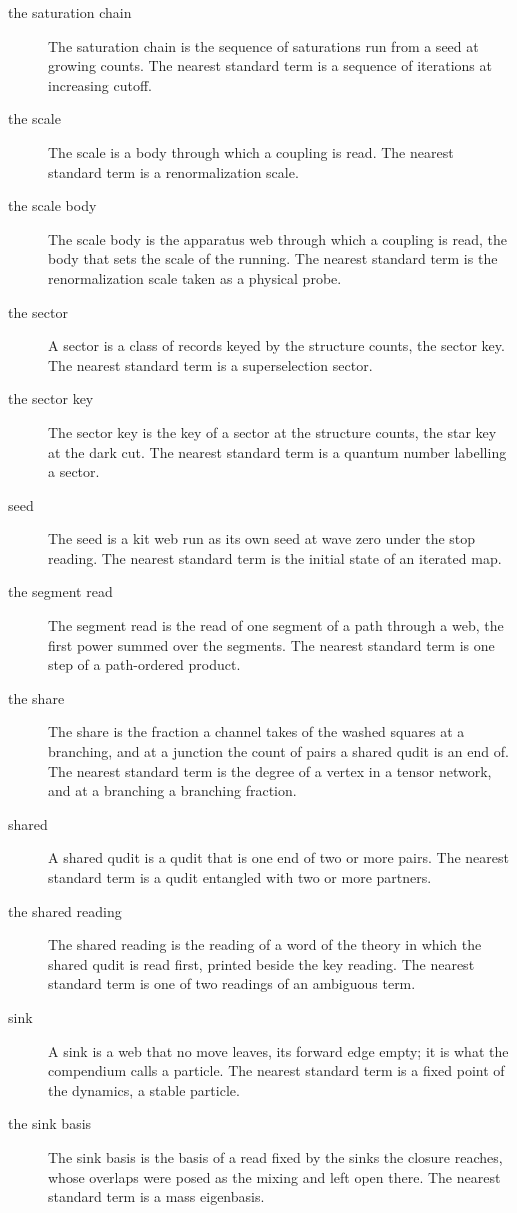 \begin{description}
\item[the saturation chain] The saturation chain is the sequence of saturations run from a seed at growing counts. The nearest standard term is a sequence of iterations at increasing cutoff.
\item[the scale] The scale is a body through which a coupling is read. The nearest standard term is a renormalization scale.
\item[the scale body] The scale body is the apparatus web through which a coupling is read, the body that sets the scale of the running. The nearest standard term is the renormalization scale taken as a physical probe.
\item[the sector] A sector is a class of records keyed by the structure counts, the sector key. The nearest standard term is a superselection sector.
\item[the sector key] The sector key is the key of a sector at the structure counts, the star key at the dark cut. The nearest standard term is a quantum number labelling a sector.
\item[seed] The seed is a kit web run as its own seed at wave zero under the stop reading. The nearest standard term is the initial state of an iterated map.
\item[the segment read] The segment read is the read of one segment of a path through a web, the first power summed over the segments. The nearest standard term is one step of a path-ordered product.
\item[the share] The share is the fraction a channel takes of the washed squares at a branching, and at a junction the count of pairs a shared qudit is an end of. The nearest standard term is the degree of a vertex in a tensor network, and at a branching a branching fraction.
\item[shared] A shared qudit is a qudit that is one end of two or more pairs. The nearest standard term is a qudit entangled with two or more partners.
\item[the shared reading] The shared reading is the reading of a word of the theory in which the shared qudit is read first, printed beside the key reading. The nearest standard term is one of two readings of an ambiguous term.
\item[sink] A sink is a web that no move leaves, its forward edge empty; it is what the compendium calls a particle. The nearest standard term is a fixed point of the dynamics, a stable particle.
\item[the sink basis] The sink basis is the basis of a read fixed by the sinks the closure reaches, whose overlaps were posed as the mixing and left open there. The nearest standard term is a mass eigenbasis.

\end{description}
